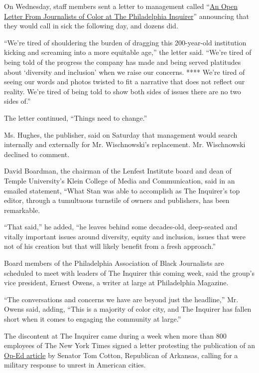 On Wednesday, staff members sent a letter to management called
``\href{https://docs.google.com/document/u/1/d/e/2PACX-1vRSXh3ATPo_bjl5iUfrFnTuC-_Z-CQKt8DGtz0LgTzURnRwiPR-SEfNcaWlMMl9PNXXMhQ_nVFGvacK/pub}{An
Open Letter From Journalists of Color at The Philadelphia Inquirer}''
announcing that they would call in sick the following day, and dozens
did.

``We're tired of shouldering the burden of dragging this 200-year-old
institution kicking and screaming into a more equitable age,'' the
letter said. ``We're tired of being told of the progress the company has
made and being served platitudes about `diversity and inclusion' when we
raise our concerns. **** We're tired of seeing our words and photos
twisted to fit a narrative that does not reflect our reality. We're
tired of being told to show both sides of issues there are no two sides
of.''

The letter continued, ``Things need to change.''

Ms. Hughes, the publisher, said on Saturday that management would search
internally and externally for Mr. Wischnowski's replacement. Mr.
Wischnowski declined to comment.

David Boardman, the chairman of the Lenfest Institute board and dean of
Temple University's Klein College of Media and Communication, said in an
emailed statement, ``What Stan was able to accomplish as The Inquirer's
top editor, through a tumultuous turnstile of owners and publishers, has
been remarkable.

``That said,'' he added, ``he leaves behind some decades-old,
deep-seated and vitally important issues around diversity, equity and
inclusion, issues that were not of his creation but that will likely
benefit from a fresh approach.''

Board members of the Philadelphia Association of Black Journalists are
scheduled to meet with leaders of The Inquirer this coming week, said
the group's vice president, Ernest Owens, a writer at large at
Philadelphia Magazine.

``The conversations and concerns we have are beyond just the headline,''
Mr. Owens said, adding, ``This is a majority of color city, and The
Inquirer has fallen short when it comes to engaging the community at
large.''

The discontent at The Inquirer came during a week when more than 800
employees of The New York Times signed a letter protesting the
publication of an
\href{https://www.nytimes3xbfgragh.onion/2020/06/04/business/new-york-times-op-ed-cotton.html}{Op-Ed
article} by Senator Tom Cotton, Republican of Arkansas, calling for a
military response to unrest in American cities.

